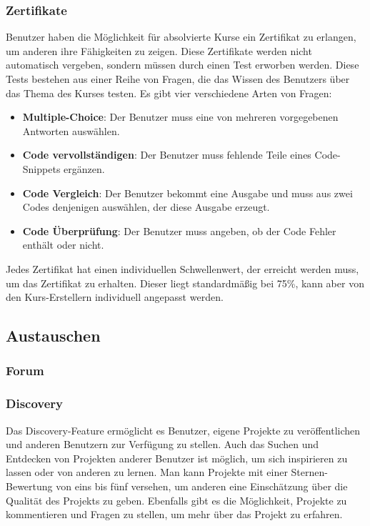 \documentclass[main.tex]{subfiles}
\begin{document}
    \subsubsection{Zertifikate}
    Benutzer haben die Möglichkeit für absolvierte Kurse ein Zertifikat zu erlangen, um anderen ihre Fähigkeiten zu zeigen.
    Diese Zertifikate werden nicht automatisch vergeben, sondern müssen durch einen Test erworben werden.
    Diese Tests bestehen aus einer Reihe von Fragen, die das Wissen des Benutzers über das Thema des Kurses testen.
    Es gibt vier verschiedene Arten von Fragen:
    \begin{itemize}
        \item \textbf{Multiple-Choice}: Der Benutzer muss eine von mehreren vorgegebenen Antworten auswählen.
        \item \textbf{Code vervollständigen}: Der Benutzer muss fehlende Teile eines Code-Snippets ergänzen.
        \item \textbf{Code Vergleich}: Der Benutzer bekommt eine Ausgabe und muss aus zwei Codes denjenigen auswählen, der diese Ausgabe erzeugt.
        \item \textbf{Code Überprüfung}: Der Benutzer muss angeben, ob der Code Fehler enthält oder nicht.
    \end{itemize}
    Jedes Zertifikat hat einen individuellen Schwellenwert, der erreicht werden muss, um das Zertifikat zu erhalten.
    Dieser liegt standardmäßig bei 75\%, kann aber von den Kurs-Erstellern individuell angepasst werden.
    \subsection{Austauschen}
    \subsubsection{Forum}
    \subsubsection{Discovery}
    Das Discovery-Feature ermöglicht es Benutzer, eigene Projekte zu veröffentlichen und anderen Benutzern zur Verfügung zu stellen.
    Auch das Suchen und Entdecken von Projekten anderer Benutzer ist möglich, um sich inspirieren zu lassen oder von anderen zu lernen.
    Man kann Projekte mit einer Sternen-Bewertung von eins bis fünf versehen, um anderen eine Einschätzung über die Qualität des Projekts zu geben.
    Ebenfalls gibt es die Möglichkeit, Projekte zu kommentieren und Fragen zu stellen, um mehr über das Projekt zu erfahren.
\end{document}
